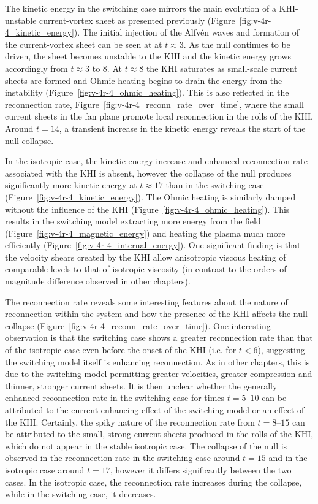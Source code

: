 The kinetic energy in the switching case mirrors the main evolution of a KHI-unstable current-vortex sheet as presented previously (Figure~\ref{fig:v-4r-4_kinetic_energy}). The initial injection of the Alfv\'en waves and formation of the current-vortex sheet can be seen at at $t\approx3$. As the null continues to be driven, the sheet becomes unstable to the KHI and the kinetic energy grows accordingly from $t\approx3$ to $8$. At $t\approx 8$ the KHI saturates as small-scale current sheets are formed and Ohmic heating begins to drain the energy from the instability (Figure~\ref{fig:v-4r-4_ohmic_heating}). This is also reflected in the reconnection rate, Figure~\ref{fig:v-4r-4_reconn_rate_over_time}, where the small current sheets in the fan plane promote local reconnection in the rolls of the KHI. Around $t=14$, a transient increase in the kinetic energy reveals the start of the null collapse. 

In the isotropic case, the kinetic energy increase and enhanced reconnection rate associated with the KHI is absent, however the collapse of the null produces significantly more kinetic energy at $t\approx 17$ than in the switching case (Figure~\ref{fig:v-4r-4_kinetic_energy}). The Ohmic heating is similarly damped without the influence of the KHI (Figure~\ref{fig:v-4r-4_ohmic_heating}). This results in the switching model extracting more energy from the field (Figure~\ref{fig:v-4r-4_magnetic_energy}) and heating the plasma much more efficiently (Figure~\ref{fig:v-4r-4_internal_energy}). One significant finding is that the velocity shears created by the KHI allow anisotropic viscous heating of comparable levels to that of isotropic viscosity (in contrast to the orders of magnitude difference observed in other chapters). 

The reconnection rate reveals some interesting features about the nature of reconnection within the system and how the presence of the KHI affects the null collapse (Figure~\ref{fig:v-4r-4_reconn_rate_over_time}). One interesting observation is that the switching case shows a greater reconnection rate than that of the isotropic case even before the onset of the KHI (i.e. for $t < 6$), suggesting the switching model itself is enhancing reconnection. As in other chapters, this is due to the switching model permitting greater velocities, greater compression and thinner, stronger current sheets. It is then unclear whether the generally enhanced reconnection rate in the switching case for times $t=5$--$10$ can be attributed to the current-enhancing effect of the switching model or an effect of the KHI. Certainly, the spiky nature of the reconnection rate from $t=8$--$15$ can be attributed to the small, strong current sheets produced in the rolls of the KHI, which do not appear in the stable isotropic case. The collapse of the null is observed in the reconnection rate in the switching case around $t=15$ and in the isotropic case around $t= 17$, however it differs significantly between the two cases. In the isotropic case, the reconnection rate increases during the collapse, while in the switching case, it decreases. 

